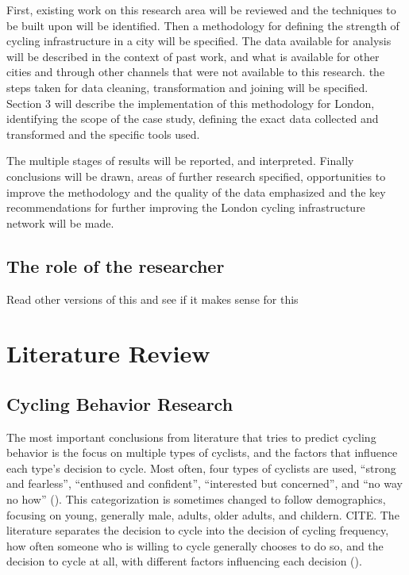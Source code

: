 \documentclass[11pt]{article} %
\begin{document}
First, existing work on this research area will be reviewed and the techniques to be built upon will be identified.  Then a methodology for defining the strength of cycling infrastructure in a city will be specified. The data available for analysis will be described in the context of past work, and what is available for other cities and through other channels that were not available to this research. the steps taken for data cleaning, transformation and joining will be specified. Section 3 will describe the implementation of this methodology for London, identifying the scope of the case study, defining the exact data collected and transformed and the specific tools used. 

The multiple stages of results will be reported, and interpreted. Finally conclusions will be drawn, areas of further research specified, opportunities to improve the methodology and the quality of the data emphasized and the key recommendations for further improving the London cycling infrastructure network will be made. 


\subsection{The role of the researcher}

Read other versions of this and see if it makes sense for this 


\section{Literature Review}

\subsection{Cycling Behavior Research}

The most important conclusions from literature that tries to predict cycling behavior is the focus on multiple types of cyclists, and the factors that influence each type's decision to cycle. Most often, four types of cyclists are used, ``strong and fearless'', ``enthused and confident'', ``interested but concerned'', and ``no way no how'' (\cite{dill2013four}). This categorization is sometimes changed to follow demographics, focusing on young, generally male, adults, older adults, and childern. CITE. The literature separates the decision to cycle into the decision of cycling frequency, how often someone who is willing to cycle generally chooses to do so, and the decision to cycle at all, with different factors influencing each decision (\cite{stinson2005comparison}). 
\end{document}
